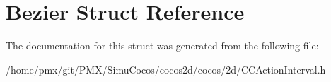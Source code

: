 \hypertarget{structBezier}{}\section{Bezier Struct Reference}
\label{structBezier}


The documentation for this struct was generated from the following file\+:\begin{DoxyCompactItemize}
\item 
/home/pmx/git/\+P\+M\+X/\+Simu\+Cocos/cocos2d/cocos/2d/C\+C\+Action\+Interval.\+h\end{DoxyCompactItemize}

